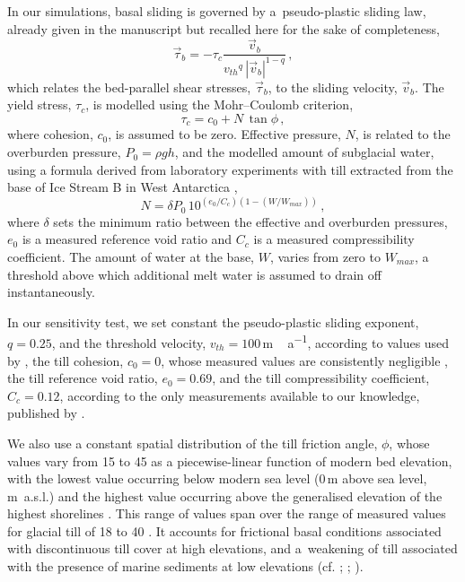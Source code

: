 \clearpage  %

In our simulations, basal sliding is governed by a~pseudo-plastic sliding law,
already given in the manuscript but recalled here for the sake of completeness,
%
\begin{equation}
    \label{eqn:pseudoplastic}
    \vec{\tau}_b = -\tau_c \frac{\vec{v}_b}{{v_{th}}^q\,|\vec{v}_b|^{1-q}} \,,
\end{equation}
%
which relates the bed-parallel shear stresses, $\vec{\tau}_b$, to the sliding
velocity, $\vec{v}_b$. The yield stress, $\tau_c$, is modelled using the
Mohr--Coulomb criterion,
%
\begin{equation}
   \tau_c = c_0 + N\,\tan{\phi} \,,
\end{equation}
%
where cohesion, $c_0$, is assumed to be zero. Effective pressure, $N$, is
related to the overburden pressure, $P_0=\rho gh$, and the modelled amount of
subglacial water, using a formula derived from laboratory experiments with till
extracted from the base of Ice Stream B in West Antarctica
\citep[Eqn.~23]{Tulaczyk.etal.2000, Bueler.Pelt.2015},
\begin{equation}
    \label{eqn:ntil}
    N = \delta P_0 \, 10^{(e_0/C_c) (1 - (W/W_{max}))} \,,
\end{equation}
where $\delta$ sets the minimum ratio between the effective and
overburden pressures, $e_0$ is a measured reference void ratio
and $C_c$ is a measured compressibility coefficient. The amount of water at the
base, $W$, varies from zero to $W_{max}$, a threshold above which additional
melt water is assumed to drain off instantaneously.

In our sensitivity test, we set constant the pseudo-plastic sliding exponent,
$q=0.25$, and the threshold velocity, $v_{th}=100$\,\unit{m\,a^{-1}}, according
to values used by \citet{Aschwanden.etal.2013}, the till cohesion, $c_0=0$,
whose measured values are consistently negligible
\citep[p.~268]{Tulaczyk.etal.2000, Cuffey.Paterson.2010}, the till reference
void ratio, $e_0=0.69$, and the till compressibility coefficient, $C_c=0.12$,
according to the only measurements available to our knowledge, published by
\citep{Tulaczyk.etal.2000}.

We also use a constant spatial distribution of the till friction angle, $\phi$,
whose values vary from 15 to 45{\degree} as a piecewise-linear function of
modern bed elevation, with the lowest value occurring below modern sea level
(0\,m above sea level, m~a.s.l.) and the highest value occurring above the
generalised elevation of the highest shorelines
\citep[200\,m~a.s.l.,][Fig.~5]{Clague.1981}. This range of values span over the
range of measured values for glacial till of 18 to 40{\degree}
\citep[p.~268]{Cuffey.Paterson.2010}. It accounts for frictional basal
conditions associated with discontinuous till cover at high elevations, and
a~weakening of till associated with the presence of marine sediments at low
elevations (cf. \citealp{Martin.etal.2011};
\citealp[supplement]{Aschwanden.etal.2013}; \citealp{PISM-authors.2015}).

